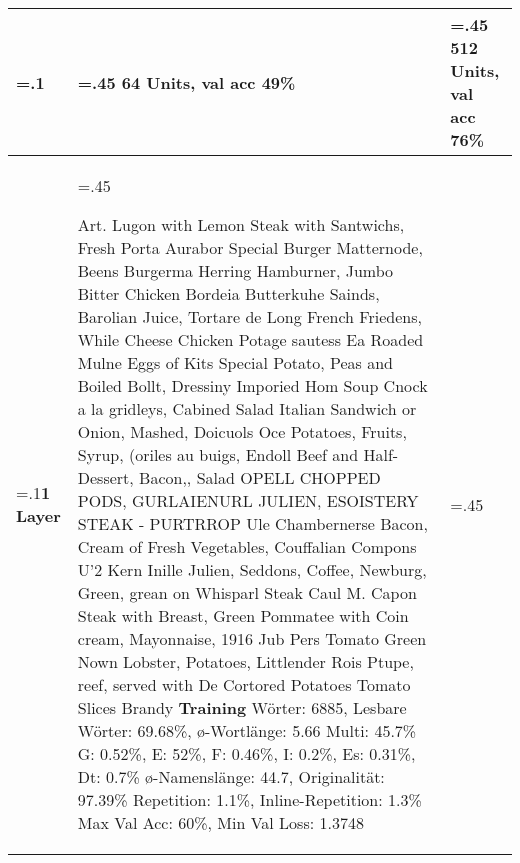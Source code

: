 \newcommand{\sn} {\vspace{1.2mm}\newline}

\begin{center}
    \begin{table}
        \centering
        \tiny
        \begin{tabularx}{\textwidth}{|>{\hsize=.1\hsize}X|>{\hsize=.45\hsize}X|>{\hsize=.45\hsize}X|}

            \hline
            \textbf{} & \textbf{64 Units, val acc 49\%} & \textbf{512 Units, val acc 76\%} \\\hline

                \textbf{1 Layer}

                &

                Art. Lugon with Lemon Steak with Santwichs, Fresh Porta \sn
                Aurabor Special \sn
                Burger Matternode, Beens \sn
                Burgerma Herring Hamburner, Jumbo Bitter \sn
                Chicken Bordeia Butterkuhe Sainds, Barolian Juice, Tortare de Long French Friedens, While Cheese \sn
                Chicken Potage sautess \sn
                Ea Roaded Mulne \sn
                Eggs of Kits Special Potato, Peas and Boiled Bollt, Dressiny \sn
                Imporied Hom Soup Cnock a la gridleys, Cabined Salad \sn
                Italian Sandwich or Onion, Mashed, Doicuols \sn
                Oce Potatoes, Fruits, Syrup, (oriles au buigs, Endoll Beef and Half-Dessert, Bacon,, Salad \sn
                OPELL CHOPPED PODS, GURLAIENURL JULIEN, ESOISTERY STEAK - PURTRROP \sn
                Ule Chambernerse Bacon, Cream of Fresh Vegetables, Couffalian Compons \sn
                U'2 Kern Inille Julien, Seddons, Coffee, Newburg, Green, grean on Whisparl \sn
                Steak Caul M. Capon \sn
                Steak with Breast, Green Pommatee with Coin cream, Mayonnaise, 1916 Jub Pers \sn
                Tomato Green Nown Lobster, Potatoes, Littlender Rois Ptupe, reef, served with De Cortored Potatoes \sn
                Tomato Slices Brandy \sn
                \sn\sn
                \textbf{Training} \sn
                Wörter: 6885, Lesbare Wörter: 69.68\%, ø-Wortlänge: 5.66\newline
                Multi: 45.7\% G: 0.52\%, E: 52\%, F: 0.46\%, I: 0.2\%, Es: 0.31\%, Dt: 0.7\% \newline
                ø-Namenslänge: 44.7, Originalität: 97.39\% \newline
                Repetition: 1.1\%, Inline-Repetition: 1.3\% \newline
                Max Val Acc: 60\%, Min Val Loss: 1.3748 \newline


\end{tabularx}
\end{table}
\end{center}
